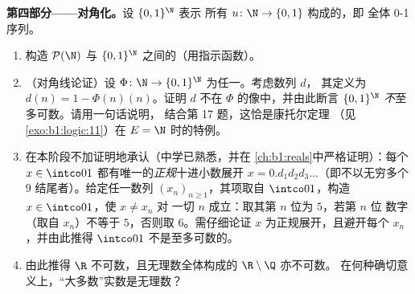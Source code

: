 \begin{problem}
\medskip
\noindent\textbf{第四部分——对角化。}设 $\{0,1\}^{\N}$ 表示
所有 $u \colon \N \to \{0, 1\}$ 构成的，即
全体 0-1 序列。
\begin{enumerate}[resume]
  \item 构造 $\mathcal{P}(\N)$ 与
        $\{0,1\}^{\N}$ 之间的（用指示函数）。
  \item （对角线论证）设 $\Phi \colon \N \to
        \{0,1\}^{\N}$ 为任一。考虑数列 $d$，
        其定义为 $d(n) = 1 - \Phi(n)(n)$。证明 $d$ 不在
        $\Phi$ 的像中，并由此断言 $\{0,1\}^{\N}$
        \emph{不}至多可数。请用一句话说明，
        结合第 17 题，这恰是康托尔定理
        （见\cref{exo:b1:logic:11}）在 $E = \N$ 时的特例。
  \item 在本阶段不加证明地承认（中学已熟悉，并在
        \cref{ch:b1:reals}中严格证明）：每个 $x \in
        \intco01$ 都有唯一的\emph{正规}十进小数展开 $x =
        0.d_1 d_2 d_3\dots$（即不以无穷多个
        $9$ 结尾者）。给定任一数列 $(x_n)_{n \geq 1}$，其项取自
        $\intco01$，构造 $x \in \intco01$，使 $x \neq x_n$ 对
        一切 $n$ 成立：取其第 $n$ 位为 $5$，若第 $n$ 位
        数字（取自 $x_n$）不等于 $5$，否则取 $6$。需仔细论证
        $x$ 为正规展开，且避开每个 $x_n$，并由此推得
        $\intco01$ 不是至多可数的。
  \item 由此推得 $\R$ 不可数，且无理数全体构成的 $\R
        \setminus \Q$ 亦不可数。
        在何种确切意义上，“大多数”实数是无理数？
\end{enumerate}


\end{problem}
